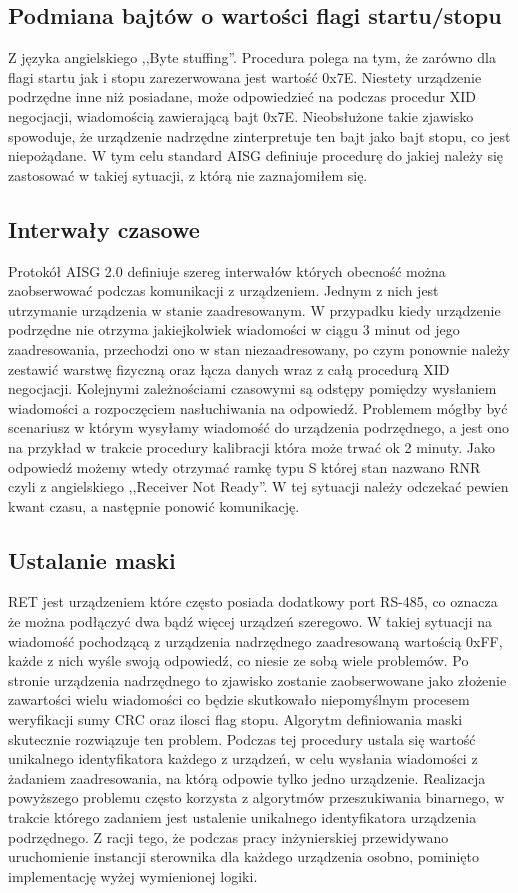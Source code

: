     \subsection{Podmiana bajtów o wartości flagi startu/stopu}
    Z języka angielskiego ,,Byte stuffing''. Procedura polega na tym, że zarówno dla flagi startu jak i stopu zarezerwowana jest wartość 0x7E.
    Niestety urządzenie podrzędne inne niż posiadane, może odpowiedzieć na podczas procedur XID negocjacji, wiadomością zawierającą bajt 0x7E. Nieobsłużone
    takie zjawisko spowoduje, że urządzenie nadrzędne zinterpretuje ten bajt jako bajt stopu, co jest niepożądane\cite{ISO-IEC-13239}. W tym celu standard AISG 
    definiuje procedurę do jakiej należy się zastosować w takiej sytuacji, z którą nie zaznajomiłem się.

    \subsection{Interwały czasowe}
    Protokół AISG 2.0 definiuje szereg interwałów których obecność można zaobserwować podczas komunikacji z urządzeniem. Jednym z nich jest
    utrzymanie urządzenia w stanie zaadresowanym. W przypadku kiedy urządzenie podrzędne nie otrzyma jakiejkolwiek wiadomości w ciągu 3 minut
    od jego zaadresowania, przechodzi ono w stan niezaadresowany, po czym ponownie należy zestawić warstwę fizyczną oraz łącza danych wraz
    z całą procedurą XID negocjacji. Kolejnymi zależnościami czasowymi są odstępy pomiędzy wysłaniem wiadomości a rozpoczęciem nasłuchiwania na odpowiedź.
    Problemem mógłby być scenariusz w którym wysyłamy wiadomość do urządzenia podrzędnego, a jest ono na przykład w trakcie procedury kalibracji która może 
    trwać ok 2 minuty. Jako odpowiedź możemy wtedy otrzymać ramkę typu S której stan nazwano RNR czyli z angielskiego ,,Receiver Not Ready''. 
    W tej sytuacji należy odczekać pewien kwant czasu, a następnie ponowić komunikację.

    \subsection{Ustalanie maski}
    RET jest urządzeniem które często posiada dodatkowy port RS-485, co oznacza że można podłączyć dwa bądź więcej urządzeń szeregowo. 
    W takiej sytuacji na wiadomość pochodzącą z urządzenia nadrzędnego zaadresowaną wartością 0xFF, każde z nich wyśle swoją odpowiedź, co niesie ze sobą wiele problemów.
    Po stronie urządzenia nadrzędnego to zjawisko zostanie zaobserwowane jako złożenie zawartości wielu wiadomości co będzie skutkowało niepomyślnym
    procesem weryfikacji sumy CRC oraz ilosci flag stopu. Algorytm definiowania maski skutecznie rozwiązuje ten problem. 
    Podczas tej procedury ustala się wartość unikalnego identyfikatora każdego z urządzeń, w celu wysłania wiadomości z żadaniem zaadresowania,
    na którą odpowie tylko jedno urządzenie. Realizacja powyższego problemu często korzysta z algorytmów przeszukiwania binarnego, w trakcie którego
    zadaniem jest ustalenie unikalnego identyfikatora urządzenia podrzędnego. Z racji tego, że podczas pracy inżynierskiej
    przewidywano uruchomienie instancji sterownika dla każdego urządzenia osobno, pominięto implementację wyżej wymienionej logiki.

